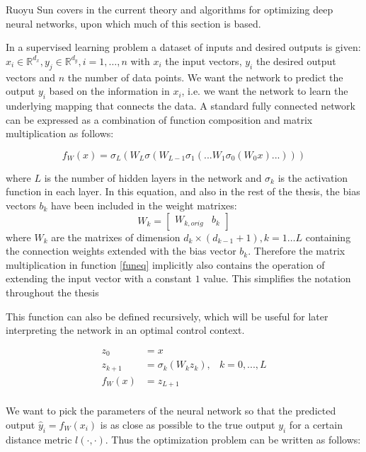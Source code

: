 Ruoyu Sun covers in \cite{sun2019optimization} the current theory and algorithms for optimizing deep neural networks, upon which much of this section is based.

In a supervised learning problem a dataset of inputs and desired outputs is given: $x_i \in \mathbb{R}^{d_x}, y_j \in \mathbb{R}^{d_y}, i = 1,\dots,n$ with $x_i$ the input vectors, $y_i$ the desired output vectors and $n$ the number of data points. We want the network to predict the output $y_i$ based on the information in $x_i$, i.e. we want the network to learn the underlying mapping that connects the data. A standard fully connected network can be expressed as a combination of function composition and matrix multiplication as follows:

\begin{equation}
         f_W(x) = \sigma_L(W_L\sigma(W_{L-1}\sigma_1(...W_1\sigma_0(W_0x)...)))
         \label{funeq}
\end{equation}

where $L$ is the number of hidden layers in the network and $\sigma_k$ is the activation function in each layer. In this equation, and also in the rest of the thesis, the bias vectors $b_k$ have been included in the weight matrixes:
\begin{equation}
W_k = \begin{bmatrix} W_{k,orig} & b_k \end{bmatrix}
\end{equation}
where $W_k$ are the matrixes of dimension $d_k \times (d_{k-1}+1), k=1 \dots L$ containing the connection weights extended with the bias vector $b_k$. Therefore the matrix multiplication in function \ref{funeq} implicitly also contains the operation of extending the input vector with a constant $1$ value. This simplifies the notation throughout the thesis

This function can also be defined recursively, which will be useful for later interpreting the network in an optimal control context.

\begin{equation}
	\begin{aligned}
	z_0 &= x \\
	z_{k+1} &= \sigma_k(W_kz_k), & k = 0,...,L \\
	f_W(x) &= z_{L+1} \\
	\end{aligned}
\label{st-eq}
\end{equation}

We want to pick the parameters of the neural network so that the predicted output $\hat{y}_i = f_W(x_i)$ is as close as possible to the true output $y_i$ for a certain distance metric $\mathit{l(\cdot,\cdot)}$. Thus the optimization problem can be written as follows:

